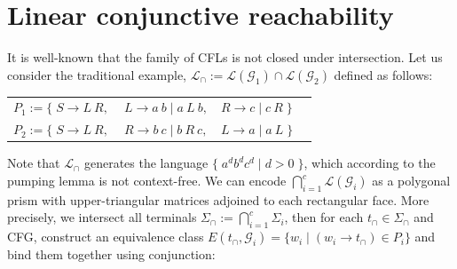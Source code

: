 \documentclass[sigplan,review,anonymous,acmsmall]{acmart}\settopmatter{printfolios=false,printccs=false,printacmref=false}
\begin{document}
\section{Linear conjunctive reachability}\label{sec:lclreach}

It is well-known that the family of CFLs is not closed under intersection. Let us consider the traditional example, $\mathcal{L}_\cap := \mathcal{L}(\mathcal{G}_1) \cap \mathcal{L}(\mathcal{G}_2)$ defined as follows:

\begin{table}[H]
\begin{tabular}{llll}
  $P_1 := \big\{\;S \rightarrow L\:R,$ & $\:L \rightarrow a\:b \mid a\:L\:b,$ & $R \rightarrow c \mid c \:R\;\big\}$\vspace{5pt}\\
  $P_2 := \big\{\;S \rightarrow L\:R,$ & $\:R \rightarrow b\:c \mid b\:R\:c,$ & $L \rightarrow a \mid a \:L\;\big\}$
\end{tabular}
\end{table}

\noindent Note that $\mathcal{L}_\cap$ generates the language $\big\{\;a^d b^d c^d \mid d > 0\;\big\}$, which according to the pumping lemma is not context-free. We can encode $\bigcap_{i=1}^c \mathcal{L}(\mathcal{G}_i)$ as a polygonal prism with upper-triangular matrices adjoined to each rectangular face. More precisely, we intersect all terminals $\Sigma_\cap := \bigcap_{i=1}^c \Sigma_i$, then for each $t_\cap \in \Sigma_\cap$ and CFG, construct an equivalence class $E(t_\cap, \mathcal{G}_i) = \{ w_i \mid (w_i \rightarrow t_\cap) \in P_i\}$ and bind them together using conjunction:\vspace{-5pt}
\end{document}
